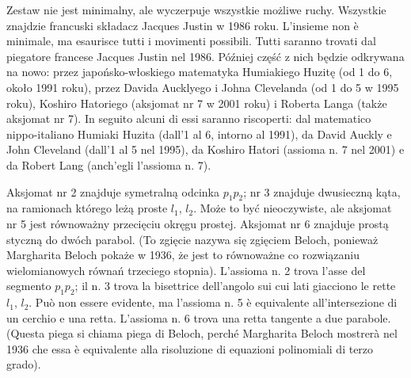 Zestaw nie jest minimalny, ale wyczerpuje wszystkie możliwe ruchy. %
Wszystkie znajdzie francuski składacz Jacques Justin \cite{justin_1986} w 1986 roku. %
L'insieme non è minimale, ma esaurisce tutti i movimenti possibili. %
Tutti saranno trovati dal piegatore francese Jacques Justin \cite{justin_1986} nel 1986. %
%
Później część z nich będzie odkrywana na nowo: przez japońsko-włoskiego matematyka Humiakiego Huzitę (od 1 do 6, około 1991 roku), przez Davida Aucklyego i Johna Clevelanda \cite{cleveland_1995} (od 1 do 5 w 1995 roku), Koshiro Hatoriego (aksjomat nr 7 w 2001 roku) i Roberta Langa \cite{alperin_2009} (także aksjomat nr 7). %
In seguito alcuni di essi saranno riscoperti: dal matematico nippo-italiano Humiaki Huzita (dall'1 al 6, intorno al 1991), da David Auckly e John Cleveland \cite{cleveland_1995} (dall'1 al 5 nel 1995), da Koshiro Hatori (assioma n. 7 nel 2001) e da Robert Lang \cite{alperin_2009} (anch'egli l'assioma n. 7). %
%
%
%
%
%

Aksjomat nr 2 znajduje symetralną odcinka $p_1 p_2$; nr 3 znajduje dwusieczną kąta, na ramionach którego leżą proste $l_1$, $l_2$. %
Może to być nieoczywiste, ale aksjomat nr 5 jest równoważny przecięciu okręgu prostej. %
Aksjomat nr 6 znajduje prostą styczną do dwóch parabol. %
(To zgięcie nazywa się zgięciem Beloch, ponieważ Margharita Beloch pokaże w 1936, że jest to równoważne co rozwiązaniu wielomianowych równań trzeciego stopnia). %
L'assioma n. 2 trova l'asse del segmento $p_1 p_2$; il n. 3 trova la bisettrice dell'angolo sui cui lati giacciono le rette $l_1$, $l_2$. %
Può non essere evidente, ma l'assioma n. 5 è equivalente all'intersezione di un cerchio e una retta. %
L'assioma n. 6 trova una retta tangente a due parabole. %
(Questa piega si chiama piega di Beloch, perché Margharita Beloch mostrerà nel 1936 che essa è equivalente alla risoluzione di equazioni polinomiali di terzo grado). %
%

